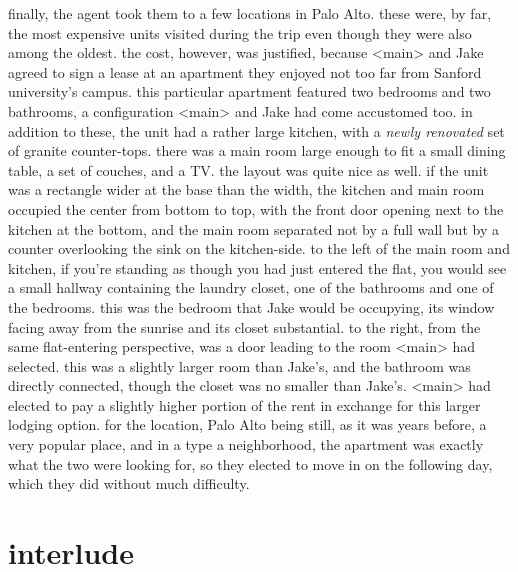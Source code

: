 \documentclass[12pt,openany]{memoir}
\begin{document}
finally, the agent took them to a few locations in Palo Alto.  these were, by far, the most expensive units visited during the trip even though they were also among the oldest.  the cost, however, was justified, because <main> and Jake agreed to sign a lease at an apartment they enjoyed not too far from Sanford university's campus.
this particular apartment featured two bedrooms and two bathrooms, a configuration <main> and Jake had come accustomed too.
in addition to these, the unit had a rather large kitchen, with a \textit{newly renovated} set of granite counter-tops.
there was a main room large enough to fit a small dining table, a set of couches, and a TV.
the layout was quite nice as well.
if the unit was a rectangle wider at the base than the width, the kitchen and main room occupied the center from bottom to top, with the front door opening next to the kitchen at the bottom, and the main room separated not by a full wall but by a counter overlooking the sink on the kitchen-side.
to the left of the main room and kitchen, if you're standing as though you had just entered the flat, you would see a small hallway containing the laundry closet, one of the bathrooms and one of the bedrooms.
this was the bedroom that Jake would be occupying, its window facing away from the sunrise and its closet substantial.
to the right, from the same flat-entering perspective, was a door leading to the room <main> had selected.
this was a slightly larger room than Jake's, and the bathroom was directly connected, though the closet was no smaller than Jake's.
<main> had elected to pay a slightly higher portion of the rent in exchange for this larger lodging option.
for the location, Palo Alto being still, as it was years before, a very popular place, and in a type a neighborhood, the apartment was exactly what the two were looking for, so they elected to move in on the following day, which they did without much difficulty.
\\

\chapter*{interlude}
\end{document}
